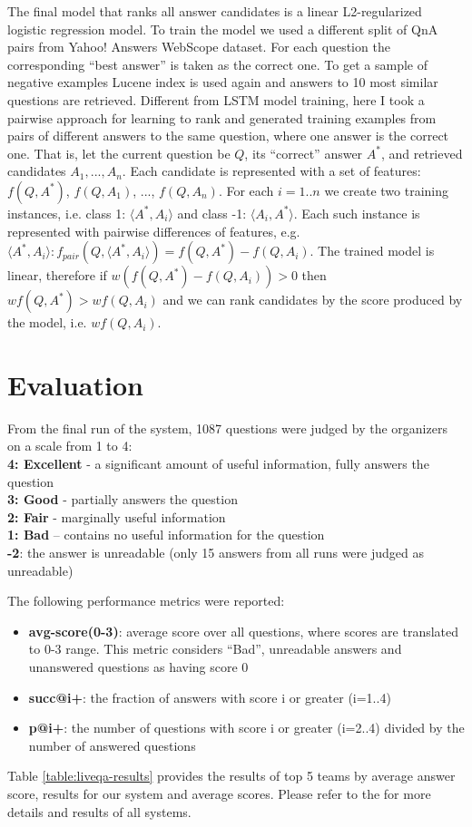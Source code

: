 \documentclass[]{article}
\begin{document}
The final model that ranks all answer candidates is a linear L2-regularized logistic regression model.
To train the model we used a different split of QnA pairs from Yahoo! Answers WebScope dataset.
For each question the corresponding ``best answer'' is taken as the correct one.
To get a sample of negative examples Lucene index is used again and answers to 10 most similar questions are retrieved.
Different from LSTM model training, here I took a pairwise approach for learning to rank and generated training examples from pairs of different answers to the same question, where one answer is the correct one.
That is, let the current question be $Q$, its ``correct'' answer $A^*$, and retrieved candidates $A_1, ..., A_n$.
Each candidate is represented with a set of features: $f(Q, A^*)$, $f(Q, A_1)$, ..., $f(Q, A_n)$.
For each $i=1..n$ we create two training instances, i.e. class 1: $\langle A^*, A_i\rangle$ and class -1: $\langle A_i, A^*\rangle$.
Each such instance is represented with pairwise differences of features, e.g. $\langle A^*, A_i\rangle: f_{pair}(Q, \langle A^*, A_i\rangle) = f(Q, A^*) - f(Q, A_i)$.
The trained model is linear, therefore if $w(f(Q, A^*) - f(Q, A_i)) > 0$ then $w f(Q, A^*) > w f(Q, A_i)$ and we can rank candidates by the score produced by the model, i.e. $w f(Q, A_i)$.

\section{Evaluation}

From the final run of the system, 1087 questions were judged by the organizers on a scale from 1 to 4:\\
\textbf{4: Excellent} - a significant amount of useful information, fully answers the question\\
\textbf{3: Good} - partially answers the question\\
\textbf{2: Fair} - marginally useful information\\
\textbf{1: Bad} – contains no useful information for the question\\
\textbf{-2}: the answer is unreadable  (only 15 answers from all runs were judged as unreadable)

The following performance metrics were reported:
\begin{itemize}
\setlength\itemsep{0mm}
\item \textbf{avg-score(0-3)}: average score over all questions, where scores are translated to 0-3 range. This metric considers ``Bad'', unreadable answers and unanswered questions as having score 0
\item \textbf{succ@i+}: the fraction of answers with score i or greater (i=1..4)
\item \textbf{p@i+}: the number of questions with score i or greater (i=2..4) divided by the number of answered questions
\end{itemize}
Table \ref{table:liveqa-results} provides the results of top 5 teams by average answer score, results for our system and average scores.
Please refer to the \cite{liveqa} for more details and results of all systems.
\end{document}
